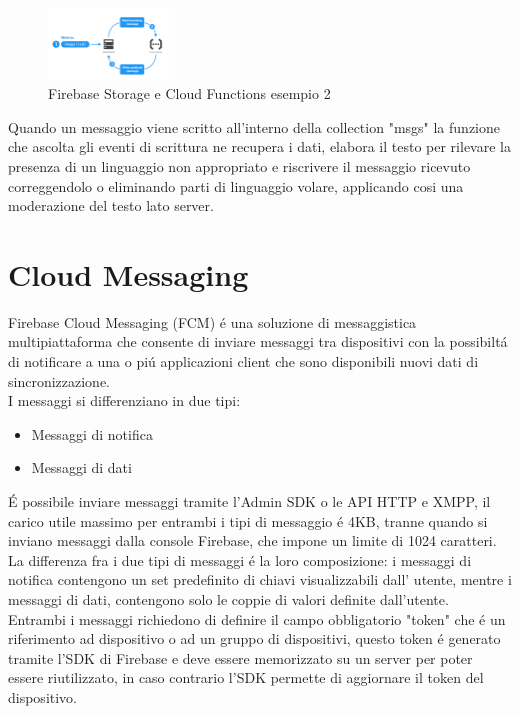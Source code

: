 \begin{figure}[h!]
  \centering
  \includegraphics[width=0.3\textwidth]{immagini/functions_ex2.png}
  \caption{Firebase Storage e Cloud Functions esempio 2}
  \label{fig:Firebase Storage e Cloud Functions esempio 2}
\end{figure}

Quando un messaggio viene scritto all'interno della collection "msgs" la funzione che ascolta gli eventi di scrittura ne recupera i dati, elabora il testo per rilevare la presenza di un linguaggio non appropriato e riscrivere il messaggio ricevuto correggendolo o eliminando parti di linguaggio volare, applicando cosi una moderazione del testo lato server.

\section{Cloud Messaging}                 %
Firebase Cloud Messaging (FCM) \'e una soluzione di messaggistica multipiattaforma che consente di inviare messaggi tra dispositivi con la possibilt\'a di notificare a una o pi\'u applicazioni client che sono disponibili nuovi dati di sincronizzazione.\\

I messaggi si differenziano in due tipi:
\begin{itemize}
  \item Messaggi di notifica
  \item Messaggi di dati

\end{itemize}

\'E possibile inviare messaggi tramite l'Admin SDK o le API HTTP e XMPP, il carico utile massimo per entrambi i tipi di messaggio \'e 4KB, tranne quando si inviano messaggi dalla console Firebase, che impone un limite di 1024 caratteri.\\
La differenza fra i due tipi di messaggi \'e la loro composizione: i messaggi di notifica contengono un set predefinito di chiavi visualizzabili dall' utente, mentre i messaggi di dati, contengono solo le coppie di valori definite dall'utente.\\
Entrambi i messaggi richiedono di definire il campo obbligatorio "token" che \'e un riferimento ad dispositivo o ad un gruppo di dispositivi, questo token \'e generato tramite l'SDK di Firebase e deve essere memorizzato su un server per poter essere riutilizzato, in caso contrario l'SDK permette di aggiornare il token del dispositivo.\\

